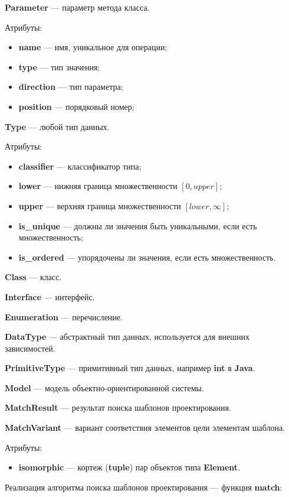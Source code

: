 \textbf{Parameter} --- параметр метода класса.

Атрибуты:
\begin{itemize}
\item \textbf{name} --- имя, уникальное для операции;
\item \textbf{type} --- тип значения;
\item \textbf{direction} --- тип параметра;
\item \textbf{position} --- порядковый номер;
\end{itemize}

\textbf{Type} --- любой тип данных.

Атрибуты:
\begin{itemize}
\item \textbf{classifier} --- классификатор типа;
\item \textbf{lower} --- нижняя граница множественности $\left [ 0, upper \right ]$;
\item \textbf{upper} --- верхняя граница множественности $\left [ lower, \infty \right ]$;
\item \textbf{is\_unique} --- должны ли значения быть уникальными, если есть множественность;
\item \textbf{is\_ordered} --- упорядочены ли значения, если есть множественность.
\end{itemize}

\textbf{Class} --- класс.

\textbf{Interface} --- интерфейс.

\textbf{Enumeration} --- перечисление.

\textbf{DataType} --- абстрактный тип данных, используется для внешних зависимостей.

\textbf{PrimitiveType} --- примитивный тип данных, например \textbf{int} в \textbf{Java}.

\textbf{Model} --- модель объектно-ориентированной системы.

\textbf{MatchResult} --- результат поиска шаблонов проектирования.

\textbf{MatchVariant} --- вариант соответствия элементов цели элементам шаблона.

Атрибуты:
\begin{itemize}
\item \textbf{isomorphic} --- кортеж (\textbf{tuple}) пар объектов типа \textbf{Element}.
\end{itemize}

Реализация алгоритма поиска шаблонов проектирования --- функция \textbf{match}:

